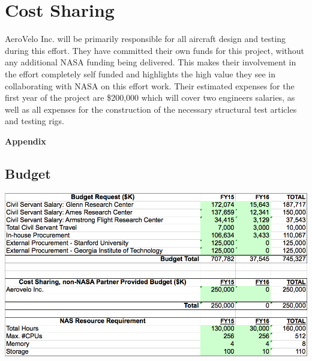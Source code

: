 \documentclass[]{aiaa-tc}
\begin{document}
  \section{Cost Sharing}
    AeroVelo Inc. will be primarily responsible for all aircraft design and testing during this effort. 
    They have committed their own funds for this project, without any additional NASA funding being delivered.
    This makes their involvement in the effort completely self funded and highlights the high value they see 
    in collaborating with NASA on this effort work. Their estimated expenses for the first year of the project are \$200,000 
    which will cover two engineers salaries, as well as all expenses for the construction of the necessary 
    structural test articles and testing rigs. 



  \clearpage
  

  \appendix
  \clearpage
  \centerline{\huge{\textbf{Appendix}}}

  \begin{landscape}
  \section{Budget}
    \centering
    \includegraphics[height=\textheight]{images/budget_request}
    \end{landscape}
\end{document}
